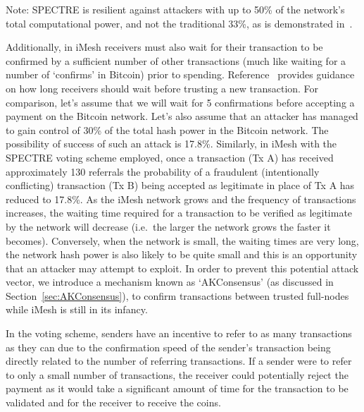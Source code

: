 \documentclass[a4paper,10pt,twocolumn]{article}
\begin{document}
	\vspace{-1.5mm}
	
	Note: SPECTRE is resilient against attackers with up to 50\% of the network's total computational power, and not the traditional 33\%, 
	as is demonstrated in~\cite{spectre}.
	
	\vspace{2.5mm}
	
	 Additionally, in iMesh receivers must also wait for their transaction to be confirmed by a sufficient number of other transactions 
	 (much like waiting for a number of `confirms' in Bitcoin) prior to spending. Reference~\cite{spectre} provides guidance on how long receivers 
	 should wait before trusting a new transaction. For comparison, let's assume that we will wait for 5 confirmations before accepting a 
	 payment on the Bitcoin network. Let's also assume that an attacker has managed to gain control of 30\% of the total hash power in the 
	 Bitcoin network. The possibility of success of such an attack is 17.8\%\cite{btc}. Similarly, in iMesh with the SPECTRE voting scheme 
	 employed, once a transaction (Tx A) has received approximately 130 referrals the probability of a fraudulent (intentionally conflicting) 
	 transaction (Tx B) being accepted as legitimate in place of Tx A has reduced to 17.8\%. As the iMesh network grows and the frequency of 
	 transactions increases, the waiting time required for a transaction to be verified as legitimate by the network will decrease (i.e.\ the 
	 larger the network grows the faster it becomes). Conversely, when the network is small, the waiting times are very long, the 
	 network hash power is also likely to be quite small and this is an opportunity that an attacker may attempt to exploit. 
	In order to prevent this potential attack vector, we introduce a mechanism known as `AKConsensus' (as discussed in Section~\ref{sec:AKConsensus}), 
	to confirm transactions between trusted full-nodes while iMesh is still in its infancy.
	
	\vspace{2.5mm}
	
	In the voting scheme, senders have an incentive to refer to as many transactions as they can due to the confirmation speed of the 
	sender's transaction being directly related to the number of referring transactions. If a sender were to refer to only a small number of 
	transactions, the receiver could potentially reject the payment as it would take a significant amount of time for the transaction to be 
	validated and for the receiver to receive the coins.
	
\end{document}
